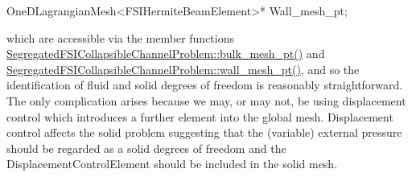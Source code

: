 \begin{DoxyCode}
OneDLagrangianMesh<FSIHermiteBeamElement>* Wall\_mesh\_pt; 
\end{DoxyCode}
 which are accessible via the member functions {\ttfamily \hyperlink{classFSICollapsibleChannelProblem_a9b461f3afef3185ea0b461714675ef8f}{Segregated\+F\+S\+I\+Collapsible\+Channel\+Problem\+::bulk\+\_\+mesh\+\_\+pt()}} and {\ttfamily \hyperlink{classFSICollapsibleChannelProblem_ae8b71da8da82f3c52387052ce400b930}{Segregated\+F\+S\+I\+Collapsible\+Channel\+Problem\+::wall\+\_\+mesh\+\_\+pt()}}, and so the identification of fluid and solid degrees of freedom is reasonably straightforward. The only complication arises because we may, or may not, be using displacement control which introduces a further element into the global mesh. Displacement control affects the solid problem suggesting that the (variable) external pressure should be regarded as a solid degrees of freedom and the {\ttfamily Displacement\+Control\+Element} should be included in the solid mesh.


